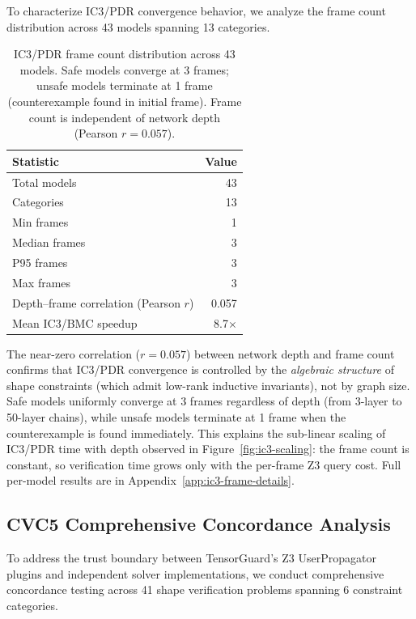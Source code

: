 \documentclass[11pt]{article}
\begin{document}
To characterize IC3/PDR convergence behavior, we analyze the frame
count distribution across 43 models spanning 13 categories.

\begin{table}[h]
\centering
\caption{IC3/PDR frame count distribution across 43 models.
  Safe models converge at 3 frames; unsafe models terminate at 1 frame
  (counterexample found in initial frame).  Frame count is independent
  of network depth (Pearson $r = 0.057$).}
\label{tab:ic3-frame-dist}
\small
\begin{tabular}{@{}lr@{}}
\toprule
\textbf{Statistic} & \textbf{Value} \\
\midrule
Total models   & 43 \\
Categories     & 13 \\
Min frames     & 1 \\
Median frames  & 3 \\
P95 frames     & 3 \\
Max frames     & 3 \\
Depth--frame correlation (Pearson $r$) & 0.057 \\
Mean IC3/BMC speedup & 8.7$\times$ \\
\bottomrule
\end{tabular}
\end{table}

The near-zero correlation ($r = 0.057$) between network depth and
frame count confirms that IC3/PDR convergence is controlled by the
\emph{algebraic structure} of shape constraints (which admit low-rank
inductive invariants), not by graph size.  Safe models uniformly
converge at 3 frames regardless of depth (from 3-layer to 50-layer
chains), while unsafe models terminate at 1 frame when the
counterexample is found immediately.  This explains the sub-linear
scaling of IC3/PDR time with depth observed in
Figure~\ref{fig:ic3-scaling}: the frame count is constant, so
verification time grows only with the per-frame Z3 query cost.
Full per-model results are in Appendix~\ref{app:ic3-frame-details}.


\subsection{CVC5 Comprehensive Concordance Analysis}\label{sec:cvc5-comprehensive}

To address the trust boundary between TensorGuard's Z3 UserPropagator
plugins and independent solver implementations, we conduct comprehensive
concordance testing across 41 shape verification problems spanning
6 constraint categories.
\end{document}
